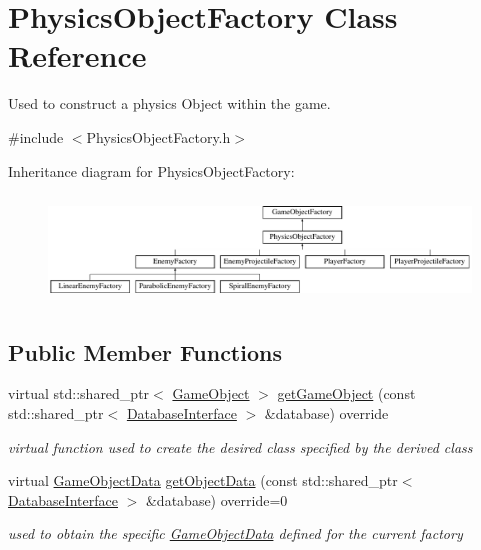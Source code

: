 \hypertarget{class_physics_object_factory}{}\section{Physics\+Object\+Factory Class Reference}
\label{class_physics_object_factory}


Used to construct a physics Object within the game.  




{\ttfamily \#include $<$Physics\+Object\+Factory.\+h$>$}

Inheritance diagram for Physics\+Object\+Factory\+:\begin{figure}[H]
\begin{center}
\leavevmode
\includegraphics[height=2.871795cm]{de/dc7/class_physics_object_factory}
\end{center}
\end{figure}
\subsection*{Public Member Functions}
\begin{DoxyCompactItemize}
\item 
virtual std\+::shared\+\_\+ptr$<$ \hyperlink{class_game_object}{Game\+Object} $>$ \hyperlink{class_physics_object_factory_a2644107d0c455c3307559cd824a7c9a8}{get\+Game\+Object} (const std\+::shared\+\_\+ptr$<$ \hyperlink{class_database_interface}{Database\+Interface} $>$ \&database) override
\begin{DoxyCompactList}\small\item\em virtual function used to create the desired class specified by the derived class \end{DoxyCompactList}\item 
virtual \hyperlink{struct_game_object_data}{Game\+Object\+Data} \hyperlink{class_physics_object_factory_aa59f52d3adc1fac676f4a8a3c2de9ba9}{get\+Object\+Data} (const std\+::shared\+\_\+ptr$<$ \hyperlink{class_database_interface}{Database\+Interface} $>$ \&database) override=0
\begin{DoxyCompactList}\small\item\em used to obtain the specific \hyperlink{struct_game_object_data}{Game\+Object\+Data} defined for the current factory \end{DoxyCompactList}\end{DoxyCompactItemize}


